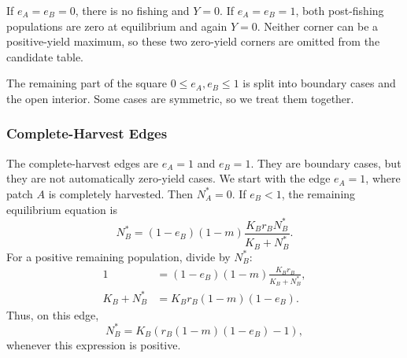 \documentclass{article}
\numberwithin{equation}{section}
\begin{document}
If $e_A=e_B=0$, there is no fishing and $Y=0$. If $e_A=e_B=1$, both
post-fishing populations are zero at equilibrium and again $Y=0$.
Neither corner can be a positive-yield maximum, so these two zero-yield
corners are omitted from the candidate table.

The remaining part of the square $0\leq e_A,e_B\leq1$ is split into
boundary cases and the open interior. Some cases are symmetric, so we
treat them together.

\subsubsection{Complete-Harvest Edges}
The complete-harvest edges are $e_A=1$ and $e_B=1$. They are boundary
cases, but they are not automatically zero-yield cases. We start with
the edge $e_A=1$, where patch $A$ is completely harvested. Then
$N_A^*=0$. If $e_B<1$, the remaining equilibrium equation is
\begin{equation*}
    N_B^*
    =
    (1-e_B)(1-m)
    \frac{K_Br_BN_B^*}{K_B+N_B^*}.
\end{equation*}
For a positive remaining population, divide by $N_B^*$:
\begin{align*}
    1
        &=
        (1-e_B)(1-m)
        \frac{K_Br_B}{K_B+N_B^*},\\
    K_B+N_B^*
        &=
        K_Br_B(1-m)(1-e_B).
\end{align*}
Thus, on this edge,
\begin{equation*}
    N_B^*=K_B\left(r_B(1-m)(1-e_B)-1\right),
\end{equation*}
whenever this expression is positive.
\end{document}
